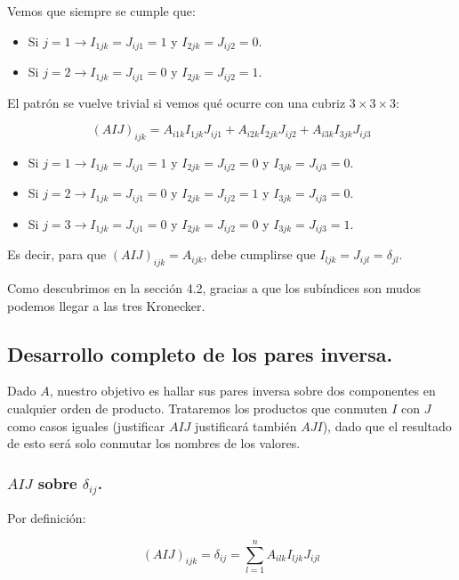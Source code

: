 Vemos que siempre se cumple que:

\begin{itemize}
	\item Si $j = 1 \rightarrow I_{1jk} = J_{ij1} = 1$ y $I_{2jk} = J_{ij2} = 0$.
	\item Si $j = 2 \rightarrow I_{1jk} = J_{ij1} = 0$ y $I_{2jk} = J_{ij2} = 1$.
\end{itemize}

El patrón se vuelve trivial si vemos qué ocurre con una cubriz $3 \times 3 \times 3$:

$$(AIJ)_{ijk} = A_{i1k} I_{1jk} J_{ij1} + A_{i2k} I_{2jk} J_{ij2} + A_{i3k} I_{3jk} J_{ij3}$$

\begin{itemize}
	\item Si $j = 1 \rightarrow I_{1jk} = J_{ij1} = 1$ y $I_{2jk} = J_{ij2} = 0$ y $I_{3jk} = J_{ij3} = 0$.
	\item Si $j = 2 \rightarrow I_{1jk} = J_{ij1} = 0$ y $I_{2jk} = J_{ij2} = 1$ y $I_{3jk} = J_{ij3} = 0$.
	\item Si $j = 3 \rightarrow I_{1jk} = J_{ij1} = 0$ y $I_{2jk} = J_{ij2} = 0$ y $I_{3jk} = J_{ij3} = 1$.
\end{itemize}

Es decir, para que $(AIJ)_{ijk} = A_{ijk}$, debe cumplirse que $I_{ljk} = J_{ijl} = \delta_{jl}$.

Como descubrimos en la sección 4.2, gracias a que los subíndices son mudos podemos llegar a las tres Kronecker.

\subsection{Desarrollo completo de los pares inversa.}

Dado $A$, nuestro objetivo es hallar sus pares inversa sobre dos componentes en cualquier orden de producto. Trataremos los productos que conmuten $I$ con $J$ como casos iguales (justificar $AIJ$ justificará también $AJI$), dado que el resultado de esto será solo conmutar los nombres de los valores.

\subsubsection{$AIJ$ sobre $\delta_{ij}$.}

Por definición:

$$(AIJ)_{ijk} = \delta_{ij} = \sum\limits^{n}_{l = 1} A_{ilk} I_{ljk} J_{ijl}$$


